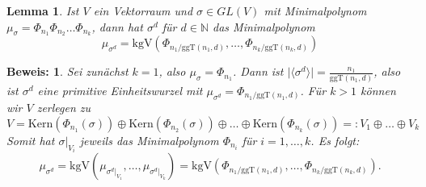 \documentclass[12pt,a4paper,halfparskip,headsepline,bibtotocnumbered]{scrreprt}
\theoremstyle{nummermitklammern}
\newtheorem{lemma}[defsatzusw]{Lemma}
\theoremstyle{nonumberbreak}
\newtheorem{beweis}{Beweis:}
\newcommand{\N}{\mathbb{N}}
\newcommand{\Kern}{\text{Kern}}
\newcommand{\ggT}{\text{ggT}}
\newcommand{\kgV}{\text{kgV}}
\begin{document}
\begin{framed}
	\begin{lemma}\label{lem:sigmaexpmipo}
		Ist $V$ ein Vektorraum und $\sigma \in GL(V)$ mit Minimalpolynom $\mu_\sigma = \Phi_{n_1} \Phi_{n_2} \dots \Phi_{n_k}$, dann hat $\sigma^d$ für $d \in \N$ das Minimalpolynom
		\begin{equation*}
			\mu_{\sigma^d} = \kgV(\Phi_{n_1 / \ggT(n_1, d)}, \dots, \Phi_{n_k / \ggT(n_k,d)})
		\end{equation*}
	\end{lemma}
\end{framed}

\begin{beweis}
	Sei zunächst $k=1$, also $\mu_\sigma = \Phi_{n_1}$. Dann ist $\vert \langle \sigma^d \rangle \vert = \frac{n_1}{\ggT(n_1,d)}$, also ist $\sigma^d$ eine primitive Einheitswurzel mit $\mu_{\sigma^d} = \Phi_{n_1/\ggT(n_1,d)}$.
	Für $k > 1$ können wir $V$ zerlegen zu 
	\begin{equation*}
		V = \Kern(\Phi_{n_1}(\sigma)) \oplus \Kern(\Phi_{n_2}(\sigma)) \oplus \dots \oplus \Kern(\Phi_{n_k}(\sigma)) =: V_1 \oplus \dots \oplus V_k
	\end{equation*}
	Somit hat $\sigma\vert_{V_i}$ jeweils das Minimalpolynom $\Phi_{n_i}$ für $i=1,\dots, k$. Es folgt:
	\begin{equation*}
		\mu_{\sigma^d} = \kgV( \mu_{\sigma^d \vert_{V_1}}, \dots, \mu_{\sigma^d\vert_{V_k}}) = \kgV(\Phi_{n_1 / \ggT(n_1, d)}, \dots, \Phi_{n_k / \ggT(n_k,d)}).
	\end{equation*}
\end{beweis}
\end{document}
